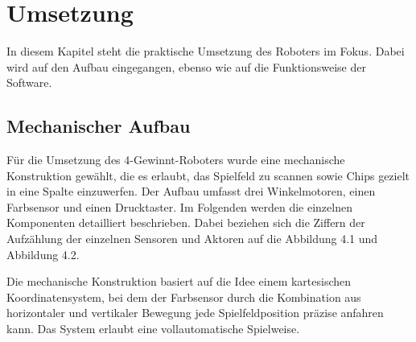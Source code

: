 \chapter{ Umsetzung}
\label{cha:Umsetzung}
In diesem Kapitel steht die praktische Umsetzung des Roboters im Fokus. Dabei wird auf den Aufbau eingegangen, ebenso wie auf die Funktionsweise der Software. 


\section{Mechanischer Aufbau}
Für die Umsetzung des 4-Gewinnt-Roboters wurde eine mechanische Konstruktion gewählt, die es erlaubt, das Spielfeld zu scannen sowie Chips gezielt in eine Spalte einzuwerfen. Der Aufbau umfasst drei Winkelmotoren, einen Farbsensor und einen Drucktaster. Im Folgenden werden die einzelnen Komponenten detailliert beschrieben. Dabei beziehen sich die Ziffern der Aufzählung der einzelnen Sensoren und Aktoren auf die Abbildung 4.1 und Abbildung 4.2.

Die mechanische Konstruktion basiert auf die Idee einem kartesischen Koordinatensystem, bei dem der Farbsensor durch die Kombination aus horizontaler und vertikaler Bewegung jede Spielfeldposition präzise anfahren kann. Das System erlaubt eine vollautomatische Spielweise.

